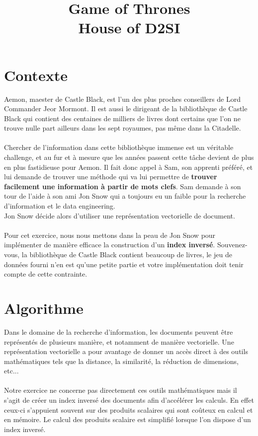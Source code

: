 \documentclass[12pt,french,titlepage]{article}
\title{\textbf{Game of Thrones} \\ House of D2SI}
\date{\vspace{-35ex}}
\begin{document}
\maketitle

\section{Contexte}

Aemon, maester de Castle Black, est l'un des plus proches conseillers de Lord Commander Jeor Mormont. Il est aussi le dirigeant de la bibliothèque de Castle Black qui contient des centaines de milliers de livres dont certains que l'on ne trouve nulle part ailleurs dans les sept royaumes, pas même dans la Citadelle.
\\\\
Chercher de l'information dans cette bibliothèque immense est un véritable challenge, et au fur et à mesure que les années passent cette tâche devient de plus en plus fastidieuse pour Aemon. Il fait donc appel à Sam, son apprenti préféré, et lui demande de trouver une méthode qui va lui permettre de \textbf{trouver facilement une information à partir de mots clefs}. Sam demande à son tour de l'aide à son ami Jon Snow qui a toujours eu un faible pour la recherche d'information et le data engineering. 
\\
Jon Snow décide alors d'utiliser une représentation vectorielle de document.
\\\\
Pour cet exercice, nous nous mettons dans la peau de Jon Snow pour implémenter de manière efficace la construction d'un \textbf{index inversé}. Souvenez-vous, la bibliothèque de Castle Black contient beaucoup de livres, le jeu de données fourni n'en est qu'une petite partie et votre implémentation doit tenir compte de cette contrainte.

\section{Algorithme}

Dans le domaine de la recherche d'information, les documents peuvent être représentés de plusieurs manière, et notamment de manière vectorielle. Une représentation vectorielle a pour avantage de donner un accès direct à des outils mathématiques tels que la distance, la similarité, la réduction de dimensions, etc...
\\\\ 
Notre exercice ne concerne pas directement ces outils mathématiques mais il s'agit de créer un index inversé des documents afin d'accélérer les calculs. En effet ceux-ci s'appuient souvent sur des produits scalaires qui sont coûteux en calcul et en mémoire. Le calcul des produits scalaire est simplifié lorsque l'on dispose d'un index inversé.
\end{document}
